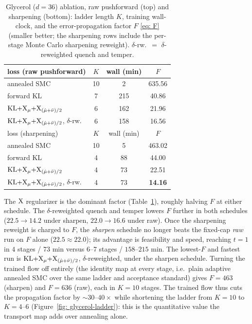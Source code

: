 \documentclass{article}
\begin{document}
\begin{table}[h]
    \centering
    \small
    \begin{tabular}{@{}lccc@{}}
        \toprule
        loss (raw pushforward) & $K$ & wall (min) & $F$ \\
        \midrule
        annealed SMC                                           & 10 & 2 & 635.56 \\
        forward KL                                             & 7 & 215 & 40.86 \\
        $\mathrm{KL}{+}\mathrm{X}_\mu{+}\mathrm{X}_{(\hat\mu+\bar\nu)/2}$              & 6 & 162 & 21.96 \\
        $\mathrm{KL}{+}\mathrm{X}_\mu{+}\mathrm{X}_{(\hat\mu+\bar\nu)/2}$, $\delta$-rw. & 6 & 158 & 16.56 \\
        \midrule
        loss (sharpening) & $K$ & wall (min) & $F$ \\
        \midrule
        annealed SMC                                           & 10 & 5 & 463.02 \\
        forward KL                                             & 4 & 88  & 44.00 \\
        $\mathrm{KL}{+}\mathrm{X}_\mu{+}\mathrm{X}_{(\hat\mu+\bar\nu)/2}$              & 4 & 73  & 22.51 \\
        $\mathrm{KL}{+}\mathrm{X}_\mu{+}\mathrm{X}_{(\hat\mu+\bar\nu)/2}$, $\delta$-rw. & 4 & 73  & \textbf{14.16} \\
        \bottomrule
    \end{tabular}
    \caption{Glycerol ($d = 36$) ablation, raw pushforward (top) and sharpening (bottom): ladder length $K$,
    training wall-clock, and the error-propagation factor $F$ \eqref{eq: F} (smaller better; the sharpening
    rows include the per-stage Monte Carlo sharpening reweight). $\delta$-rw.\ $=$ $\delta$-reweighted quench
    and temper.}
    \label{tab: glycerol}
\end{table}

The $\mathrm{X}$ regularizer is the dominant factor (Table~\ref{tab: glycerol}), roughly halving $F$ at either schedule. The $\delta$-reweighted
quench and temper lowers $F$ further in both schedules ($22.5 \!\to\! 14.2$ under sharpen, $22.0 \!\to\! 16.6$
under raw). Once the sharpening reweight is charged to $F$, the \emph{sharpen} schedule no longer beats the
fixed-cap \emph{raw} run on $F$ alone ($22.5 \approx 22.0$); its advantage is feasibility and speed, reaching
$t = 1$ in $4$ stages / $73$ min versus $6$--$7$ stages / $158$--$215$ min. The lowest-$F$ and fastest run is
$\mathrm{KL}{+}\mathrm{X}_\mu{+}\mathrm{X}_{(\hat\mu+\bar\nu)/2}$, $\delta$-reweighted, under the sharpen schedule. Turning the trained
flow off entirely (the identity map at every stage, i.e.\ plain adaptive annealed SMC over the same ladder
and acceptance standard) gives $F = 463$ (sharpen) and $F = 636$ (raw), each in $K = 10$ stages. The trained
flow thus cuts the propagation factor by ${\sim}30$--$40\times$ while shortening the ladder from $K = 10$ to $K = 4$--$6$ (Figure~\ref{fig: glycerol-ladder}): this
is the quantitative value the transport map adds over annealing alone.
\end{document}
